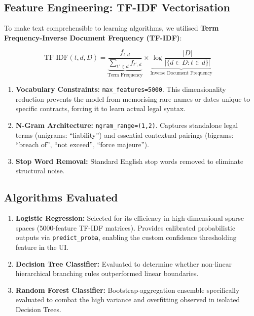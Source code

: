 \documentclass[12pt,a4paper]{article}
\begin{document}
\subsection{Feature Engineering: TF-IDF Vectorisation}

To make text comprehensible to learning algorithms, we utilised \textbf{Term
Frequency-Inverse Document Frequency (TF-IDF)}:

\begin{equation}
\text{TF-IDF}(t, d, D) =
\underbrace{\frac{f_{t,d}}{\sum_{t' \in d} f_{t',d}}}_{\text{Term Frequency}}
\times
\underbrace{\log\frac{|D|}{|\{d \in D : t \in d\}|}}_{\text{Inverse Document Frequency}}
\end{equation}

\begin{enumerate}
    \item \textbf{Vocabulary Constraints:} \texttt{max\_features=5000}. This
    dimensionality reduction prevents the model from memorising rare names or dates
    unique to specific contracts, forcing it to learn actual legal syntax.

    \item \textbf{N-Gram Architecture:} \texttt{ngram\_range=(1,2)}. Captures
    standalone legal terms (unigrams: ``liability'') and essential contextual
    pairings (bigrams: ``breach of'', ``not exceed'', ``force majeure'').

    \item \textbf{Stop Word Removal:} Standard English stop words removed to
    eliminate structural noise.
\end{enumerate}

\subsection{Algorithms Evaluated}

\begin{enumerate}
    \item \textbf{Logistic Regression:} Selected for its efficiency in high-dimensional
    sparse spaces (5000-feature TF-IDF matrices). Provides calibrated probabilistic
    outputs via \texttt{predict\_proba}, enabling the custom confidence thresholding
    feature in the UI.

    \item \textbf{Decision Tree Classifier:} Evaluated to determine whether
    non-linear hierarchical branching rules outperformed linear boundaries.

    \item \textbf{Random Forest Classifier:} Bootstrap-aggregation ensemble specifically
    evaluated to combat the high variance and overfitting observed in isolated
    Decision Trees.
\end{enumerate}
\end{document}
